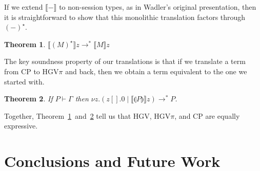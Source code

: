 \documentclass{easychair}
\makeatletter
\newtheorem{theorem}{Theorem}
\newcommand{\ba}{\begin{array}}
\newcommand{\ea}{\end{array}}
\newenvironment{equations}{\[\ba{@{}r@{~}c@{~}l@{}}}{\ea\]}
\newcommand{\cptogv}[1]{\llparenthesis{#1}\rrparenthesis}
\newcommand{\cpj}[2]{{#1} \vdash {#2}}
\newcommand{\gvj}[3]{{#1} \vdash {#2} : {#3}}
\newcommand{\G}{\Gamma}
\newcommand{\cpCut}[3]{\nu {#1}.({#2} \mid {#3})}
\newcommand{\cpEmptyOut}[1]{{#1}[].0}
\newcommand{\cpDual}[1]{{#1}^\bot}
\newcommand{\hgv}{HGV\xspace}
\newcommand{\hgvpi}{HGV$\pi$\xspace}
\newcommand{\lampi}[1]{({#1})^\star}
\newcommand{\hgvcp}[1]{\llbracket{#1}\rrbracket}
\newcommand{\redto}{\longrightarrow}
\makeatother
\begin{document}
If we extend $\hgvcp{-}$ to non-session types, as in Wadler's original presentation, then it is
straightforward to show that this monolithic translation factors through $\lampi{-}$.
\begin{theorem}
\label{th:factor}
$\hgvcp{\lampi{M}}z \redto^* \hgvcp{M}z$
\end{theorem}
\noindent
The key soundness property of our translations is that if we translate a term from CP to \hgvpi and
back, then we obtain a term equivalent to the one we started with.
\begin{theorem}
\label{th:soundness}
If $\cpj{P}{\G}$ then $\cpCut{z}{\cpEmptyOut{z}}{\hgvcp{\cptogv{P}}z} \redto^* P$.
\end{theorem}
\noindent
Together, Theorem~\ref{th:factor}~and~\ref{th:soundness} tell us that \hgv, \hgvpi, and CP are
equally expressive.



%








\section{Conclusions and Future Work}
\label{sect:conclusion}
\end{document}
